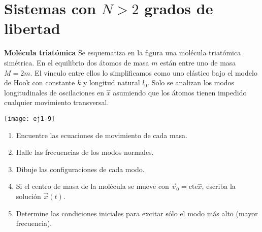 \section*{Sistemas con \(N> 2\) grados de libertad}


\item
\begin{minipage}[t][2.6cm]{0.75\textwidth}
\textbf{Molécula triatómica}
Se esquematiza en la figura una molécula triatómica simétrica.
En el equilibrio dos átomos de masa $m$ están entre uno de masa $M = 2 m$.
El vínculo entre ellos lo simplificamos como uno elástico bajo el modelo de Hook con constante $k$ y longitud natural $l_0$.
Solo se analizan los modos longitudinales de oscilaciones en \(\hat{x}\) asumiendo que los átomos tienen impedido cualquier movimiento transversal.
\end{minipage}
\begin{minipage}[c][0cm][t]{0.2\textwidth}
  \texttt{[image: ej1-9]}
\end{minipage}
\begin{enumerate}
	\item Encuentre las ecuaciones de movimiento de cada masa. 
	\item Halle las frecuencias de los modos normales. 
	\item Dibuje las configuraciones de cada modo. 
	\item Si el centro de masa de la molécula se mueve con $\vec{v}_0 = \mathrm{cte} \hat{x}$, escriba la solución $\vec{x}(t)$.
	\item Determine las condiciones iniciales para excitar sólo el modo más alto (mayor frecuencia).
\end{enumerate}



